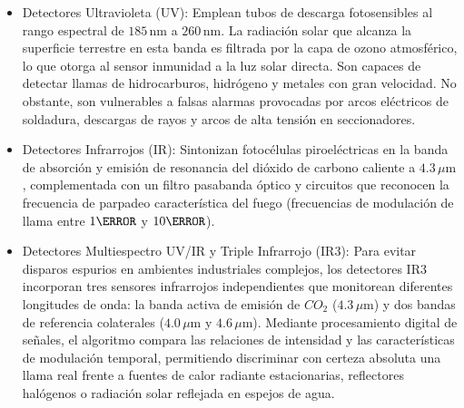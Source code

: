 \begin{itemize}
    \item Detectores Ultravioleta (UV): Emplean tubos de descarga fotosensibles al rango espectral de $185\,\mathrm{nm}$ a
          $260\,\mathrm{nm}$. La radiación solar que alcanza la superficie terrestre en esta banda es filtrada por la capa de
          ozono atmosférico, lo que otorga al sensor inmunidad a la luz solar directa. Son capaces de detectar llamas de
          hidrocarburos, hidrógeno y metales con gran velocidad. No obstante, son vulnerables a falsas alarmas provocadas por
          arcos eléctricos de soldadura, descargas de rayos y arcos de alta tensión en seccionadores.
    \item Detectores Infrarrojos (IR): Sintonizan fotocélulas piroeléctricas en la banda de absorción y emisión de
          resonancia del dióxido de carbono caliente a $4.3\,\mu\mathrm{m}$, complementada con un filtro pasabanda óptico y
          circuitos que reconocen la frecuencia de parpadeo característica del fuego (frecuencias de modulación de llama
          entre $1\Hz$ y $10\Hz$).
    \item Detectores Multiespectro UV/IR y Triple Infrarrojo (IR3): Para evitar disparos espurios en ambientes industriales
          complejos, los detectores IR3 incorporan tres sensores infrarrojos independientes que monitorean diferentes
          longitudes de onda: la banda activa de emisión de $CO_2$ ($4.3\,\mu\mathrm{m}$) y dos bandas de referencia
          colaterales ($4.0\,\mu\mathrm{m}$ y $4.6\,\mu\mathrm{m}$). Mediante procesamiento digital de señales, el algoritmo
          compara las relaciones de intensidad y las características de modulación temporal, permitiendo discriminar con
          certeza absoluta una llama real frente a fuentes de calor radiante estacionarias, reflectores halógenos o radiación
          solar reflejada en espejos de agua.
\end{itemize}
